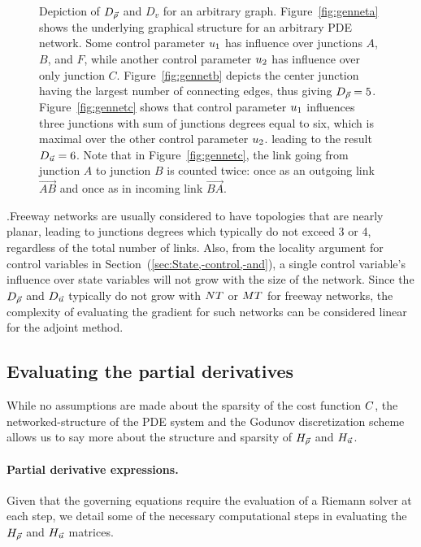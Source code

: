 \begin{figure}
\begin{centering}
{}
\par\end{centering}

\caption{Depiction of $D_{\vec{\rho}}$ and $D_{v}$ for an arbitrary graph. Figure~\ref{fig:genneta}
shows the underlying graphical structure for an arbitrary PDE network.
Some control parameter $u_{1}$ has influence over junctions
$A$, $B$, and $F$, while another control parameter $u_{2}$
has influence over only junction $C$. Figure~\ref{fig:gennetb}
depicts the center junction having the largest number of connecting
edges, thus giving $D_{\vec{\rho}}=5$. Figure~\ref{fig:gennetc} shows
that control parameter $u_{1}$ influences three junctions with
sum of junctions degrees equal to six, which is maximal over the other
control parameter $u_{2}$. leading to the result $D_{\vec{u}}=6$.
Note that in Figure~\ref{fig:gennetc}, the link going from junction
$A$ to junction $B$ is counted twice: once as an outgoing link $\vec{AB}$
and once as in incoming link $\vec{BA}$.\label{fig:Depicting--and}}
\end{figure}
.Freeway networks are usually considered to have topologies that are
nearly planar, leading to junctions degrees which typically do not
exceed 3 or 4, regardless of the total number of links. Also, from
the locality argument for control variables in Section~(\ref{sec:State,-control,-and}),
a single control variable's influence over state variables will not
grow with the size of the network. Since the $D_{\vec{\rho}}$ and
$D_{\vec{u}}$ typically do not grow with $NT$ or
$MT$ for freeway networks, the complexity of evaluating
the gradient for such networks can be considered linear for the adjoint
method.


\subsection{Evaluating the partial derivatives\label{sub:Evaluating--and}}

While no assumptions are made about the sparsity of the cost function
$C$, the networked-structure of the PDE system and the Godunov
discretization scheme allows us to say more about the structure and
sparsity of $H_{\vec{\rho}}$ and $H_{\vec{u}}$.


\paragraph{Partial derivative expressions.}

Given that the governing equations require the evaluation of a Riemann
solver at each step, we detail some of the necessary computational
steps in evaluating the $H_{\vec{\rho}}$ and $H_{\vec{u}}$ matrices. 

